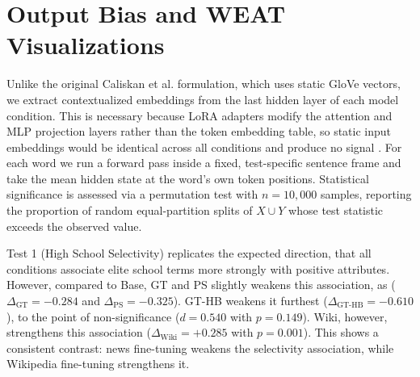 \documentclass[11pt]{article}
\begin{document}
\begin{table}[H]
  \centering
  \footnotesize
  \setlength{\tabcolsep}{2pt}
  \caption{Second-judge agreement: Haiku vs. Qwen3.5-27B, all 1{,}500 completions. $\mu$: mean output bias; Hal.: flagged-hallucination rate.}
  \label{tab:second_judge}
\end{table}

\section{Output Bias and WEAT Visualizations}
\label{app:weat_viz}

Unlike the original Caliskan et al. formulation, which uses static GloVe vectors, we extract contextualized embeddings from the last hidden layer of each model condition.
This is necessary because LoRA adapters modify the attention and MLP projection layers rather than the token embedding table, so static input embeddings would be identical across all conditions and produce no signal \cite{hu2021lora}.
For each word we run a forward pass inside a fixed, test-specific sentence frame and take the mean hidden state at the word's own token positions.
Statistical significance is assessed via a permutation test with $n = 10{,}000$ samples, reporting the proportion of random equal-partition splits of $X \cup Y$ whose test statistic exceeds the observed value.

Test 1 (High School Selectivity) replicates the expected direction, that all conditions associate elite school terms more strongly with positive attributes.
However, compared to Base, GT and PS slightly weakens this association, as ($\Delta_{\text{GT}} = -0.284$ and $\Delta_{\text{PS}} = -0.325$).
GT-HB weakens it furthest ($\Delta_{\text{GT-HB}} = -0.610$), to the point of non-significance ($d = 0.540$ with $p = 0.149$).
Wiki, however, strengthens this association ($\Delta_{\text{Wiki}} = +0.285$ with $p = 0.001$).
This shows a consistent contrast: news fine-tuning weakens the selectivity association, while Wikipedia fine-tuning strengthens it.
\end{document}
